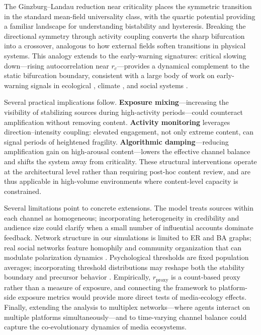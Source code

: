 \documentclass[preprint,12pt]{elsarticle}
\begin{document}
The Ginzburg--Landau reduction near criticality places the symmetric transition in the standard mean-field universality class, with the quartic potential providing a familiar landscape for understanding bistability and hysteresis. Breaking the directional symmetry through activity coupling converts the sharp bifurcation into a crossover, analogous to how external fields soften transitions in physical systems. This analogy extends to the early-warning signatures: critical slowing down---rising autocorrelation near $r_c$---provides a dynamical complement to the static bifurcation boundary, consistent with a large body of work on early-warning signals in ecological \cite{Scheffer2009,Scheffer2012}, climate \cite{Lenton2012RSTA}, and social systems \cite{Bury2021}.

Several practical implications follow. \textbf{Exposure mixing}---increasing the visibility of stabilizing sources during high-activity periods---could counteract amplification without removing content. \textbf{Activity monitoring} leverages direction--intensity coupling: elevated engagement, not only extreme content, can signal periods of heightened fragility. \textbf{Algorithmic damping}---reducing amplification gain on high-arousal content---lowers the effective channel balance and shifts the system away from criticality. These structural interventions operate at the architectural level rather than requiring post-hoc content review, and are thus applicable in high-volume environments where content-level capacity is constrained.

Several limitations point to concrete extensions. The model treats sources within each channel as homogeneous; incorporating heterogeneity in credibility and audience size could clarify when a small number of influential accounts dominate feedback. Network structure in our simulations is limited to ER and BA graphs; real social networks feature homophily and community organization that can modulate polarization dynamics \cite{McPherson2001,Dandekar2013}. Psychological thresholds are fixed population averages; incorporating threshold distributions may reshape both the stability boundary and precursor behavior \cite{Schwartz2013,Pfefferbaum2020}. Empirically, $r_{\text{proxy}}$ is a count-based proxy rather than a measure of exposure, and connecting the framework to platform-side exposure metrics would provide more direct tests of media-ecology effects. Finally, extending the analysis to multiplex networks---where agents interact on multiple platforms simultaneously---and to time-varying channel balance could capture the co-evolutionary dynamics of media ecosystems.
\end{document}
